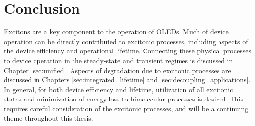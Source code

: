 \documentclass[../thesis.tex]{subfiles}
\begin{document}
\section{Conclusion}

Excitons are a key component to the operation of OLEDs.
Much of device operation can be directly contributed to excitonic processes, including aspects of the device efficiency and operational lifetime.\supercite{Reineke2007,Giebink2008a,Hershey2016}
Connecting these physical processes to device operation in the steady-state and transient regimes is discussed in Chapter \ref{sec:unified}.
Aspects of degradation due to excitonic processes are discussed in Chapters \ref{sec:integrated_lifetime} and \ref{sec:decoupling_applications}.
In general, for both device efficiency and lifetime, utilization of all excitonic states and minimization of energy loss to bimolecular processes is desired.
This requires careful consideration of the excitonic processes, and will be a continuing theme throughout this thesis.






\end{document}
